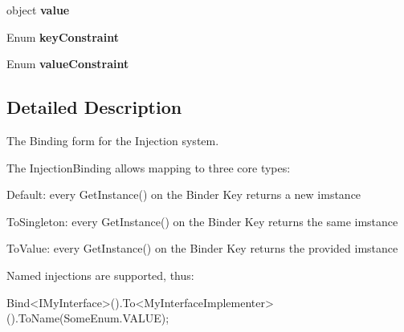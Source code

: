 \begin{DoxyCompactItemize}
\item 
\hypertarget{interfacestrange_1_1extensions_1_1injector_1_1api_1_1_i_injection_binding_a1d64e731e4732f1acd876a76d1b1a33b}{object {\bfseries value}}\label{interfacestrange_1_1extensions_1_1injector_1_1api_1_1_i_injection_binding_a1d64e731e4732f1acd876a76d1b1a33b}

\item 
\hypertarget{interfacestrange_1_1extensions_1_1injector_1_1api_1_1_i_injection_binding_af62e792e40a882f5d2c52a372e0746b0}{Enum {\bfseries key\-Constraint}}\label{interfacestrange_1_1extensions_1_1injector_1_1api_1_1_i_injection_binding_af62e792e40a882f5d2c52a372e0746b0}

\item 
\hypertarget{interfacestrange_1_1extensions_1_1injector_1_1api_1_1_i_injection_binding_a9ee8175bec67b2f20e2bd6162b45eb8c}{Enum {\bfseries value\-Constraint}}\label{interfacestrange_1_1extensions_1_1injector_1_1api_1_1_i_injection_binding_a9ee8175bec67b2f20e2bd6162b45eb8c}

\end{DoxyCompactItemize}


\subsection{Detailed Description}
The Binding form for the Injection system. 

The Injection\-Binding allows mapping to three core types\-: 
\begin{DoxyItemize}
\item Default\-: every {\ttfamily Get\-Instance()} on the Binder Key returns a new imstance 
\item To\-Singleton\-: every {\ttfamily Get\-Instance()} on the Binder Key returns the same imstance 
\item To\-Value\-: every {\ttfamily Get\-Instance()} on the Binder Key returns the provided imstance 
\end{DoxyItemize}

Named injections are supported, thus\-: \begin{DoxyVerb}Bind<IMyInterface>().To<MyInterfaceImplementer>().ToName(SomeEnum.VALUE);
\end{DoxyVerb}


